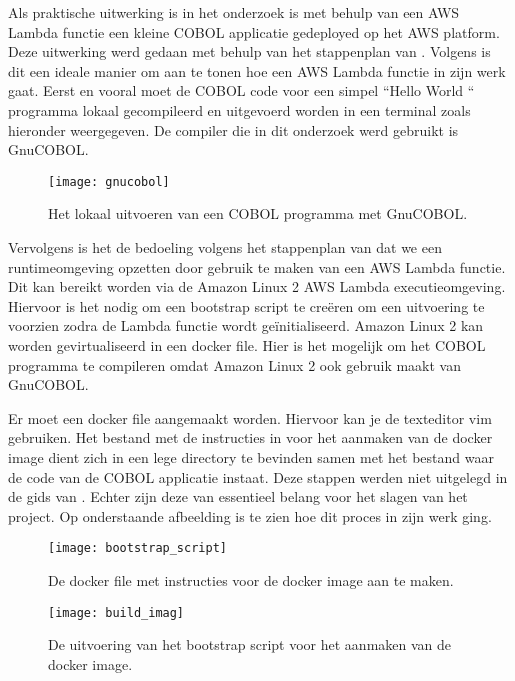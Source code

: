 \newpage

Als praktische uitwerking is in het onderzoek is met behulp van een AWS Lambda functie een kleine COBOL applicatie gedeployed op het AWS platform. Deze uitwerking werd gedaan met behulp van het stappenplan van \textcite{Paika2020}. Volgens \textcite{Paika2020} is dit een ideale manier om aan te tonen hoe een AWS Lambda functie in zijn werk gaat. Eerst en vooral moet de COBOL code voor een simpel ``Hello World `` programma lokaal gecompileerd en uitgevoerd worden in een terminal zoals hieronder weergegeven. De compiler die in dit onderzoek werd gebruikt is GnuCOBOL.  
    \begin{figure}[h]
        \centering
        \texttt{[image: gnucobol]}
        \caption{Het lokaal uitvoeren van een COBOL programma met GnuCOBOL.}
     \end{figure}
 
 \newpage
 
 Vervolgens is het de bedoeling volgens het stappenplan van \textcite{Paika2020} dat we een runtimeomgeving opzetten door gebruik te maken van een AWS Lambda functie. Dit kan bereikt worden via de Amazon Linux 2 AWS Lambda executieomgeving. Hiervoor is het nodig om een bootstrap script te creëren om een uitvoering te voorzien zodra de Lambda functie wordt geïnitialiseerd. Amazon Linux 2 kan worden gevirtualiseerd in een docker file. Hier is het mogelijk om het COBOL programma te compileren omdat Amazon Linux 2 ook gebruik maakt van GnuCOBOL. 
 
 Er moet een docker file aangemaakt worden. Hiervoor kan je de texteditor vim gebruiken. Het bestand met de instructies in voor het aanmaken van de docker image dient zich in een lege directory te bevinden samen met het bestand waar de code van de COBOL applicatie instaat. Deze stappen werden niet uitgelegd in de gids van \textcite{Paika2020}. Echter zijn deze van essentieel belang voor het slagen van het project. Op onderstaande afbeelding is te zien hoe dit proces in zijn werk ging. 
 
  \begin{figure}[h]
     \centering
     \texttt{[image: bootstrap\_script]}
     \caption{De docker file met instructies voor de docker image aan te maken.}
 \end{figure}

  \begin{figure}[h]
    \centering
    \texttt{[image: build\_imag]}
    \caption{De uitvoering van het bootstrap script voor het aanmaken van de docker image.}
\end{figure}

